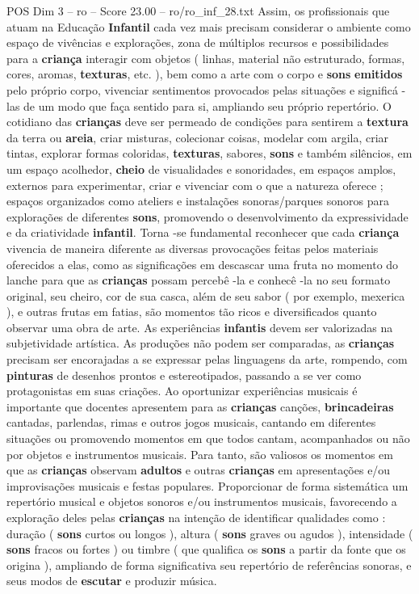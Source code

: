 \begin{textsample}{POS Dim 3 – ro – Score 23.00 – ro/ro\_inf\_28.txt}
Assim, os profissionais que atuam na Educação \textbf{Infantil} cada vez mais precisam considerar o ambiente como espaço de vivências e explorações, zona de múltiplos recursos e possibilidades para a \textbf{criança} interagir com objetos ( linhas, material não estruturado, formas, cores, aromas, \textbf{texturas}, etc. ), bem como a arte com o corpo e \textbf{sons} \textbf{emitidos} pelo próprio corpo, vivenciar sentimentos provocados pelas situações e significá -las de um modo que faça sentido para si, ampliando seu próprio repertório.
O cotidiano das \textbf{crianças} deve ser permeado de condições para sentirem a \textbf{textura} da terra ou \textbf{areia}, criar misturas, colecionar coisas, modelar com argila, criar tintas, explorar formas coloridas, \textbf{texturas}, sabores, \textbf{sons} e também silêncios, em um espaço acolhedor, \textbf{cheio} de visualidades e sonoridades, em espaços amplos, externos para experimentar, criar e vivenciar com o que a natureza oferece ; espaços organizados como ateliers e instalações sonoras/parques sonoros para explorações de diferentes \textbf{sons}, promovendo o desenvolvimento da expressividade e da criatividade \textbf{infantil}.
Torna -se fundamental reconhecer que cada \textbf{criança} vivencia de maneira diferente as diversas provocações feitas pelos materiais oferecidos a elas, como as significações em descascar uma fruta no momento do lanche para que as \textbf{crianças} possam percebê -la e conhecê -la no seu formato original, seu cheiro, cor de sua casca, além de seu sabor ( por exemplo, mexerica ), e outras frutas em fatias, são momentos tão ricos e diversificados quanto observar uma obra de arte.
As experiências \textbf{infantis} devem ser valorizadas na subjetividade artística.
As produções não podem ser comparadas, as \textbf{crianças} precisam ser encorajadas a se expressar pelas linguagens da arte, rompendo, com \textbf{pinturas} de desenhos prontos e estereotipados, passando a se ver como protagonistas em suas criações.
Ao oportunizar experiências musicais é importante que docentes apresentem para as \textbf{crianças} canções, \textbf{brincadeiras} cantadas, parlendas, rimas e outros jogos musicais, cantando em diferentes situações ou promovendo momentos em que todos cantam, acompanhados ou não por objetos e instrumentos musicais.
Para tanto, são valiosos os momentos em que as \textbf{crianças} observam \textbf{adultos} e outras \textbf{crianças} em apresentações e/ou improvisações musicais e festas populares.
Proporcionar de forma sistemática um repertório musical e objetos sonoros e/ou instrumentos musicais, favorecendo a exploração deles pelas \textbf{crianças} na intenção de identificar qualidades como : duração ( \textbf{sons} curtos ou longos ), altura ( \textbf{sons} graves ou agudos ), intensidade ( \textbf{sons} fracos ou fortes ) ou timbre ( que qualifica os \textbf{sons} a partir da fonte que os origina ), ampliando de forma significativa seu repertório de referências sonoras, e seus modos de \textbf{escutar} e produzir música.

\end{textsample}
